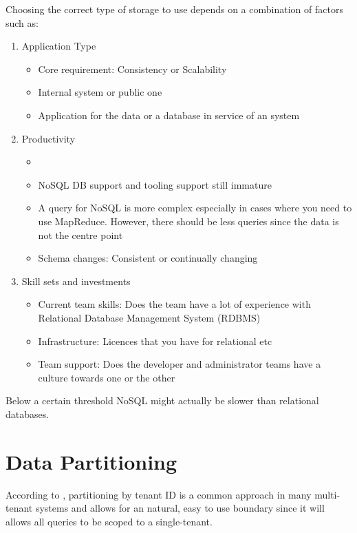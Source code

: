 Choosing the correct type of storage to use depends on a combination of factors such as:
 

\begin{enumerate}
\item Application Type
\begin{itemize}
    \item Core requirement: Consistency or Scalability
    \item Internal system or public one
    \item Application for the data or a database in service of an system
\end{itemize}
\item Productivity
\begin{itemize}
\item 
    \item NoSQL DB support and tooling support still immature
    \item A query for NoSQL is more complex especially in cases where you           need to use MapReduce. However, there should be less queries              since the data is not the centre point
    \item Schema changes: Consistent or continually changing
\end{itemize}
\item Skill sets and investments
\begin{itemize}
    \item Current team skills: Does the team have a lot of experience with           Relational Database Management System (RDBMS)
    \item Infrastructure: Licences that you have for relational etc
    \item Team support: Does the developer and administrator teams have a           culture towards one or the other
\end{itemize}
\end{enumerate}

Below a certain threshold NoSQL might actually be slower than relational databases.

\section{Data Partitioning}

According to \cite{Betts2012-ad}, partitioning by tenant ID is a common approach in many multi-tenant systems and allows for an natural, easy to use boundary since it will allows all queries to be scoped to a single-tenant.
 
